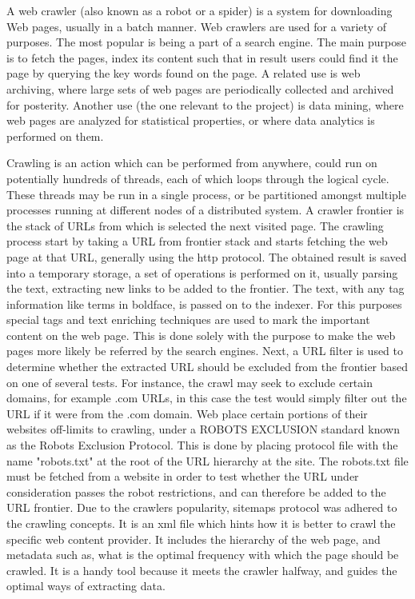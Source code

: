 A web crawler (also known as a robot or a spider) is a system for downloading Web pages, usually in a batch manner. Web crawlers are used for a variety of
purposes. The most popular is being a part of a search engine. The main purpose is to fetch the pages, index its content such that in result users could find it the page by querying the key words found on the page. A related use is web archiving, where large sets of web pages are periodically collected and archived for posterity. Another use (the one relevant to the project) is data mining, where web pages are analyzed for statistical properties, or where data analytics is performed on them.

Crawling is an action which can be performed from anywhere, could run on potentially hundreds of threads, each of which loops through the logical cycle. These threads may be run in a single process, or be partitioned amongst multiple processes running at different nodes of a distributed system. A crawler frontier is the stack of URLs from which is selected the next visited page. The crawling process start by taking a URL from frontier stack and starts fetching the web page at that URL, generally using the http protocol. The obtained result is saved into a temporary storage, a set of operations is performed on it, usually parsing the text, extracting new links to be added to the frontier. The text, with any tag information like terms in
boldface, is passed on to the indexer. For this purposes special tags and text enriching techniques are used to mark the important content on the web page. This is done solely with the purpose to make the web pages more likely be referred by the search engines. Next, a URL filter is used to determine whether the extracted URL should be excluded from the frontier based on one of several tests. For instance, the crawl may seek to exclude certain domains, for example .com  URLs, in this case the test would simply filter out the URL if it were from the .com domain. Web place certain portions of their websites off-limits to crawling, under a ROBOTS EXCLUSION standard known as the Robots Exclusion Protocol. This is done by placing protocol file with the name "robots.txt" at the root of the URL hierarchy at the site. The robots.txt file must be fetched from a website in order to test whether the URL under consideration passes the robot restrictions, and can therefore be added to the URL frontier. Due to the crawlers popularity, sitemaps protocol was adhered to the crawling concepts. It is an xml file which hints how it is better to crawl the specific web content provider. It includes the hierarchy of the web page, and metadata such as, what is the optimal frequency with which the page should be crawled. It is a handy tool because it meets the crawler halfway, and guides the optimal ways of extracting data.

